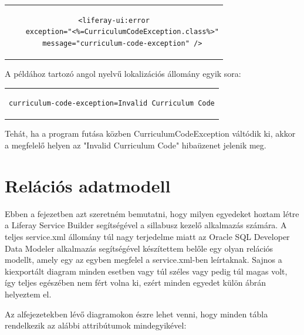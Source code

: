 \documentclass[hidelinks, 12pt, a4paper]{report}
\begin{document}
\begin{minipage}{\linewidth}
\begin{center}
\begin{tabular}{c}
\begin{lstlisting}
<liferay-ui:error
	exception="<%=CurriculumCodeException.class%>"
	message="curriculum-code-exception" />
\end{lstlisting}
\end{tabular}
\end{center}
\end{minipage}

\medskip
A példához tartozó angol nyelvű lokalizációs állomány egyik sora:

\begin{minipage}{\linewidth}
\begin{center}
\begin{tabular}{c}
\begin{lstlisting}
curriculum-code-exception=Invalid Curriculum Code
\end{lstlisting}
\end{tabular}
\end{center}
\end{minipage}

\medskip
Tehát, ha a program futása közben CurriculumCodeException váltódik ki, akkor a megfelelő helyen az "Invalid Curriculum Code" hibaüzenet jelenik meg.

\section{Relációs adatmodell}

Ebben a fejezetben azt szeretném bemutatni, hogy milyen egyedeket hoztam létre a Liferay Service Builder segítségével a sillabusz kezelő alkalmazás számára. A teljes service.xml állomány túl nagy terjedelme miatt az Oracle SQL Developer Data Modeler alkalmazás segítségével készítettem belőle egy olyan relációs modellt, amely egy az egyben megfelel a service.xml-ben leírtaknak. Sajnos a kiexportált diagram minden esetben vagy túl széles vagy pedig túl magas volt, így teljes egészében nem fért volna ki, ezért minden egyedet külön ábrán helyeztem el.

Az alfejezetekben lévő diagramokon észre lehet venni, hogy minden tábla rendelkezik az alábbi attribútumok mindegyikével:
\end{document}
